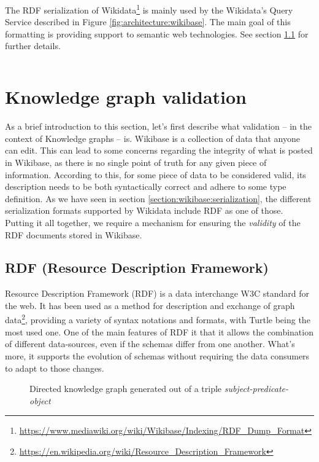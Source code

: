The RDF serialization of Wikidata\footnote{\url{https://www.mediawiki.org/wiki/Wikibase/Indexing/RDF_Dump_Format}} is mainly used by the Wikidata's Query Service described in Figure \ref{fig:architecture:wikibase}. The main goal of this formatting is providing support to semantic web technologies. See section \ref{section:RDF} for further details.

\inputminted[highlightlines={3,6,7,9},highlightcolor=blueUniovi!15]{turtle}{listings/serialization.rdf}

\section{Knowledge graph validation}

As a brief introduction to this section, let's first describe what validation -- in the context of Knowledge graphs -- is. Wikibase is a collection of data that anyone can edit. This can lead to some concerns regarding the integrity of what is posted in Wikibase, as there is no single point of truth for any given piece of information. According to this, for some piece of data to be considered valid, its description needs to be both syntactically correct and adhere to some type definition. As we have seen in section \ref{section:wikibase:serialization}, the different serialization formats supported by Wikidata include RDF as one of those. Putting it all together, we require a mechanism for ensuring the \textit{validity} of the RDF documents stored in Wikibase.

\subsection{RDF (Resource Description Framework)}
\label{section:RDF}

Resource Description Framework (RDF) is a data interchange W3C standard for the web. It has been used as a method for description and exchange of graph data\footnote{\url{https://en.wikipedia.org/wiki/Resource_Description_Framework}}, providing a variety of syntax notations and formats, with Turtle being the most used one. One of the main features of RDF it that it allows the combination of different data-sources, even if the schemas differ from one another. What's more, it supports the evolution of schemas without requiring the data consumers to adapt to those changes.

\begin{figure}[ht]
    \centering
    
    \caption{Directed knowledge graph generated out of a triple \textit{subject-predicate-object}}
    \label{fig:RDF}
\end{figure}

